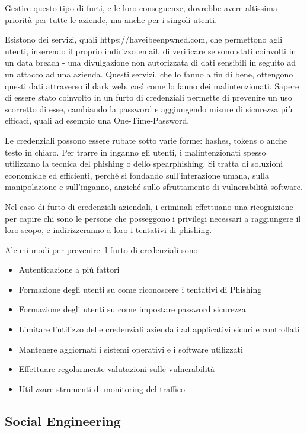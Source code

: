 Gestire questo tipo di furti, e le loro conseguenze, dovrebbe avere altissima priorità per tutte le aziende, ma anche per i singoli utenti.

Esistono dei servizi, quali https://haveibeenpwned.com, che permettono agli utenti, inserendo il proprio indirizzo email, di verificare se sono stati coinvolti in un data breach - una divulgazione non autorizzata di dati sensibili in seguito ad un attacco ad una azienda. Questi servizi, che lo fanno a fin di bene, ottengono questi dati attraverso il dark web, così come lo fanno dei malintenzionati. Sapere di essere stato coinvolto in un furto di credenziali permette di prevenire un uso scorretto di esse, cambiando la password e aggiungendo misure di sicurezza più efficaci, quali ad esempio una One-Time-Password.

Le credenziali possono essere rubate sotto varie forme: hashes, tokens o anche testo in chiaro. Per trarre in inganno gli utenti, i malintenzionati spesso utilizzano la tecnica del phishing o dello spearphishing. Si tratta di soluzioni economiche ed efficienti, perché si fondando sull'interazione umana, sulla manipolazione e sull'inganno, anziché sullo sfruttamento di vulnerabilità software.

Nel caso di furto di credenziali aziendali, i criminali effettuano una ricognizione per capire chi sono le persone che posseggono i privilegi necessari a raggiungere il loro scopo, e indirizzeranno a loro i tentativi di phishing.

Alcuni modi per prevenire il furto di credenziali sono:
\begin{itemize}
    \item Autenticazione a più fattori
    \item Formazione degli utenti su come riconoscere i tentativi di Phishing
    \item Formazione degli utenti su come impostare password sicurezza
    \item Limitare l'utilizzo delle credenziali aziendali ad applicativi sicuri e controllati
    \item Mantenere aggiornati i sistemi operativi e i software utilizzati
    \item Effettuare regolarmente valutazioni sulle vulnerabilità
    \item Utilizzare strumenti di monitoring del traffico
\end{itemize}

\subsection{Social Engineering}

